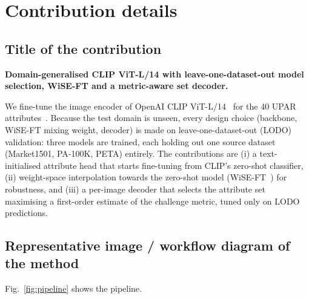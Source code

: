 \documentclass[a4paper, 10pt, conference]{ieeeconf}
\begin{document}
%
\section{Contribution details}
%

\subsection{Title of the contribution}
\textbf{Domain-generalised CLIP ViT-L/14 with leave-one-dataset-out model selection, WiSE-FT and a metric-aware set decoder.}

We fine-tune the image encoder of OpenAI CLIP ViT-L/14~\cite{radford2021clip} for the 40 UPAR attributes~\cite{Specker_2023_WACV}. Because the test domain is unseen, every design choice (backbone, WiSE-FT mixing weight, decoder) is made on leave-one-dataset-out (LODO) validation: three models are trained, each holding out one source dataset (Market1501, PA-100K, PETA) entirely. The contributions are (i) a text-initialised attribute head that starts fine-tuning from CLIP's zero-shot classifier, (ii) weight-space interpolation towards the zero-shot model (WiSE-FT~\cite{wortsman2022wiseft}) for robustness, and (iii) a per-image decoder that selects the attribute set maximising a first-order estimate of the challenge metric, tuned only on LODO predictions.

\subsection{Representative image / workflow diagram of the method}
Fig.~\ref{fig:pipeline} shows the pipeline.
\end{document}
